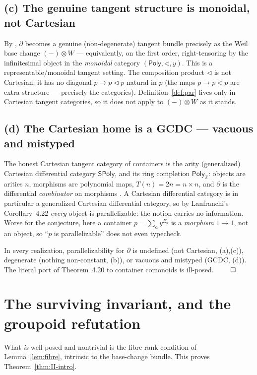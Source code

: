 \documentclass[11pt]{article}
\theoremstyle{definition}
\newcommand{\Poly}{\mathsf{Poly}}
\newcommand{\PolyZ}{\mathsf{Poly}_{\mathbb{Z}}}
\newcommand{\SPoly}{\mathsf{SPoly}}
\begin{document}
\subsection*{(c) The genuine tangent structure is monoidal, not Cartesian}

By \cite{MacBethUniqueness,LanfranchiLemay2025}, $\partial$ becomes a genuine (non-degenerate)
tangent bundle precisely as the Weil base change $(-)\otimes W$ --- equivalently, on the first
order, right-tensoring by the infinitesimal object in the \emph{monoidal} category $(\Poly,\lhd,y)$.
This is a representable/monoidal tangent setting. The composition product $\lhd$ is not Cartesian:
it has no diagonal $p\to p\lhd p$ natural in $p$ (the maps $p\to p\lhd p$ are extra structure ---
precisely the categories). Definition~\ref{def:par} lives only in Cartesian tangent categories, so
it does not apply to $(-)\otimes W$ as it stands.

\subsection*{(d) The Cartesian home is a GCDC --- vacuous and mistyped}

The honest Cartesian tangent category of containers is the arity (generalized) Cartesian
differential category $\SPoly$, and its ring completion $\PolyZ$: objects are arities $n$,
morphisms are polynomial maps, $T(n)=2n=n\times n$, and $\partial$ is the differential
\emph{combinator} on morphisms \cite{MacBethTangent,MacBethCartan}. A Cartesian differential
category is in particular a generalized Cartesian differential category, so by
Lanfranchi's Corollary~4.22 \cite{Lanfranchi2026} \emph{every} object is parallelizable: the
notion carries no information. Worse for the conjecture, here a container $p=\sum_a y^{E_a}$ is a
\emph{morphism} $1\to1$, not an object, so ``$p$ is parallelizable'' does not even typecheck.

\medskip
\noindent In every realization, parallelizability for $\partial$ is undefined (not Cartesian,
(a),(c)), degenerate (nothing non-constant, (b)), or vacuous and mistyped (GCDC, (d)). The literal
port of Theorem~4.20 to container comonoids is ill-posed. $\qed$

\section{The surviving invariant, and the groupoid refutation}\label{sec:survivor}

What \emph{is} well-posed and nontrivial is the fibre-rank condition of Lemma~\ref{lem:fibre},
intrinsic to the base-change bundle. This proves Theorem~\ref{thm:II-intro}.
\end{document}
